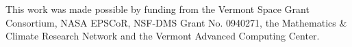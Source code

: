 \begin{acknowledgements}
  This work was made possible by funding from the Vermont Space Grant Consortium, NASA EPSCoR, NSF-DMS Grant No. 0940271, the Mathematics \& Climate Research Network and the Vermont Advanced Computing Center.
\end{acknowledgements}

